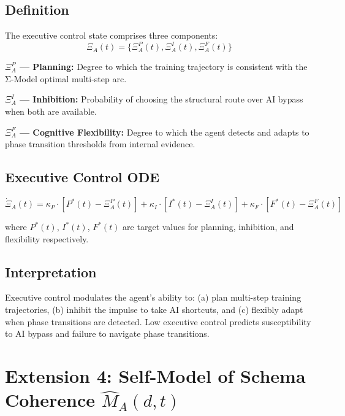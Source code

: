 \documentclass[11pt,a4paper]{article}
\begin{document}
\subsection{Definition}

The executive control state comprises three components:
\begin{equation}\label{app:eq:executive-state}
\Xi_A(t) = \{\Xi_A^P(t), \Xi_A^I(t), \Xi_A^F(t)\}
\end{equation}

\textbf{$\Xi_A^P$ --- Planning:} Degree to which the training trajectory
is consistent with the Σ-Model optimal multi-step arc.

\textbf{$\Xi_A^I$ --- Inhibition:} Probability of choosing the structural
route over AI bypass when both are available.

\textbf{$\Xi_A^F$ --- Cognitive Flexibility:} Degree to which the agent
detects and adapts to phase transition thresholds from internal evidence.

\subsection{Executive Control ODE}

\begin{equation}\label{app:eq:executive-ode}
\dot{\Xi}_A(t) = \kappa_P \cdot [P^*(t) - \Xi_A^P(t)] + \kappa_I \cdot [I^*(t) - \Xi_A^I(t)] + \kappa_F \cdot [F^*(t) - \Xi_A^F(t)]
\end{equation}

where $P^*(t)$, $I^*(t)$, $F^*(t)$ are target values for planning,
inhibition, and flexibility respectively.

\subsection{Interpretation}

Executive control modulates the agent's ability to: (a) plan multi-step
training trajectories, (b) inhibit the impulse to take AI shortcuts,
and (c) flexibly adapt when phase transitions are detected. Low
executive control predicts susceptibility to AI bypass and failure
to navigate phase transitions.

\section{Extension 4: Self-Model of Schema Coherence $\hat{M}_A(d,t)$}\label{app:metacognition}
\end{document}

